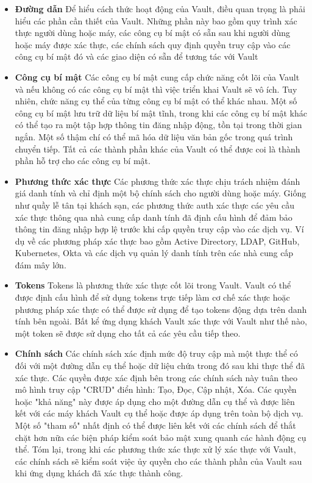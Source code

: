 \documentclass[12pt,a4paper]{report}
\begin{document}
	
	\begin{itemize}
		\item \textbf{Đường dẫn}
		\smallskip
		\subitem
			{Để hiểu cách thức hoạt động của Vault, điều quan trọng là phải hiểu các phần cần thiết của Vault. Những phần này bao gồm quy trình xác thực người dùng hoặc máy, các công cụ bí mật có sẵn sau khi người dùng hoặc máy được xác thực, các chính sách quy định quyền truy cập vào các công cụ bí mật đó và các giao diện có sẵn để tương tác với Vault}
		\item \textbf{Công cụ bí mật}
		\smallskip
		\subitem
			{Các công cụ bí mật cung cấp chức năng cốt lõi của Vault và nếu không có các công cụ bí mật thì việc triển khai Vault sẽ vô ích. Tuy nhiên, chức năng cụ thể của từng công cụ bí mật có thể khác nhau.}
			{Một số công cụ bí mật lưu trữ dữ liệu bí mật tĩnh, trong khi các công cụ bí mật khác có thể tạo ra một tập hợp thông tin đăng nhập động, tồn tại trong thời gian ngắn. Một số thậm chí có thể mã hóa dữ liệu văn bản gốc trong quá trình chuyển tiếp. Tất cả các thành phần khác của Vault có thể được coi là thành phần hỗ trợ cho các công cụ bí mật.}
		\item \textbf{Phương thức xác thực}
		\smallskip
		\subitem
			{Các phương thức xác thực chịu trách nhiệm đánh giá danh tính và chỉ định một bộ chính sách cho người dùng hoặc máy. Giống như quầy lễ tân tại khách sạn, các phương thức auth xác thực các yêu cầu xác thực thông qua nhà cung cấp danh tính đã định cấu hình để đảm bảo thông tin đăng nhập hợp lệ trước khi cấp quyền truy cập vào các dịch vụ. Ví dụ về các phương pháp xác thực bao gồm Active Directory, LDAP, GitHub, Kubernetes, Okta và các dịch vụ quản lý danh tính trên các nhà cung cấp đám mây lớn.}
		\item \textbf{Tokens}
		\smallskip
		\subitem
			{Tokens là phương thức xác thực cốt lõi trong Vault. Vault có thể được định cấu hình để sử dụng tokens trực tiếp làm cơ chế xác thực hoặc phương pháp xác thực có thể được sử dụng để tạo tokens động dựa trên danh tính bên ngoài. Bất kể ứng dụng khách Vault xác thực với Vault như thế nào, một token sẽ được sử dụng cho tất cả các yêu cầu tiếp theo.}
		\item \textbf{Chính sách}
		\smallskip
		\subitem
			{Các chính sách xác định mức độ truy cập mà một thực thể có đối với một đường dẫn cụ thể hoặc dữ liệu chứa trong đó sau khi thực thể đã xác thực. Các quyền được xác định bên trong các chính sách này tuân theo mô hình truy cập "CRUD" điển hình: Tạo, Đọc, Cập nhật, Xóa. Các quyền hoặc "khả năng" này được áp dụng cho một đường dẫn cụ thể và được liên kết với các máy khách Vault cụ thể hoặc được áp dụng trên toàn bộ dịch vụ. Một số "tham số" nhất định có thể được liên kết với các chính sách để thắt chặt hơn nữa các biện pháp kiểm soát bảo mật xung quanh các hành động cụ thể. Tóm lại, trong khi các phương thức xác thực xử lý xác thực với Vault, các chính sách sẽ kiểm soát việc ủy quyền cho các thành phần của Vault sau khi ứng dụng khách đã xác thực thành công.}
	\end{itemize}
\end{document}
